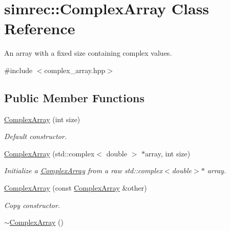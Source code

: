 \hypertarget{classsimrec_1_1ComplexArray}{\section{simrec\-:\-:\-Complex\-Array \-Class \-Reference}
\label{classsimrec_1_1ComplexArray}
}


\-An array with a fixed size containing complex values.  




{\ttfamily \#include $<$complex\-\_\-array.\-hpp$>$}

\subsection*{\-Public \-Member \-Functions}
\begin{DoxyCompactItemize}
\item 
\hypertarget{classsimrec_1_1ComplexArray_a86e1e6f77ebe1fec2da3e49c8a698f51}{\hyperlink{classsimrec_1_1ComplexArray_a86e1e6f77ebe1fec2da3e49c8a698f51}{\-Complex\-Array} (int size)}\label{classsimrec_1_1ComplexArray_a86e1e6f77ebe1fec2da3e49c8a698f51}

\begin{DoxyCompactList}\small\item\em \-Default constructor. \end{DoxyCompactList}\item 
\hypertarget{classsimrec_1_1ComplexArray_aa0036df89c3b0235c5749560861436c0}{\hyperlink{classsimrec_1_1ComplexArray_aa0036df89c3b0235c5749560861436c0}{\-Complex\-Array} (std\-::complex$<$ double $>$ $\ast$array, int size)}\label{classsimrec_1_1ComplexArray_aa0036df89c3b0235c5749560861436c0}

\begin{DoxyCompactList}\small\item\em \-Initialize a \hyperlink{classsimrec_1_1ComplexArray}{\-Complex\-Array} from a raw std\-::complex$<$double$>$$\ast$ array. \end{DoxyCompactList}\item 
\hypertarget{classsimrec_1_1ComplexArray_a9d465502f2fb5f1e60e174199115993c}{\hyperlink{classsimrec_1_1ComplexArray_a9d465502f2fb5f1e60e174199115993c}{\-Complex\-Array} (const \hyperlink{classsimrec_1_1ComplexArray}{\-Complex\-Array} \&other)}\label{classsimrec_1_1ComplexArray_a9d465502f2fb5f1e60e174199115993c}

\begin{DoxyCompactList}\small\item\em \-Copy constructor. \end{DoxyCompactList}\item 
\hypertarget{classsimrec_1_1ComplexArray_ab43d4afa961ad46b074d93941ca2a97f}{\hyperlink{classsimrec_1_1ComplexArray_ab43d4afa961ad46b074d93941ca2a97f}{$\sim$\-Complex\-Array} ()}\label{classsimrec_1_1ComplexArray_ab43d4afa961ad46b074d93941ca2a97f}


\end{DoxyCompactItemize}
